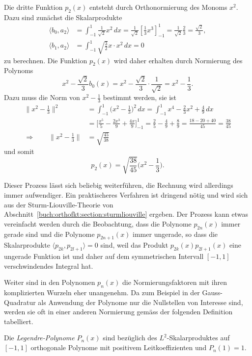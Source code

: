 Die dritte Funktion $p_2(x)$ entsteht durch Orthonormierung des
Monoms $x^2$.
Dazu sind zunächst die Skalarprodukte
\begin{align*}
\langle b_0,a_2\rangle
&=
\int_{-1}^1 \frac{1}{\!\sqrt{2}}x^2\,dx
=
\frac{1}{\!\sqrt{2}} [\frac13x^3]_{-1}^1
=
\frac{1}{\!\sqrt{2}} \frac{2}{3}
=
\frac{\!\sqrt{2}}{3},
\\
\langle b_1,a_2\rangle
&=
\int_{-1}^1 \!\sqrt{\frac{3}{2}} x \cdot x^2\,dx
= 
0
\end{align*}
zu berechnen.
Die Funktion $p_2(x)$ wird daher erhalten durch Normierung des Polynoms
\[
x^2 - 
\frac{\!\sqrt{2}}{3} b_0(x)
=
x^2-
\frac{\!\sqrt{2}}{3}\cdot\frac{1}{\!\sqrt{2}}
=
x^2-\frac13.
\]
Dazu muss die Norm von $x^2-\frac13$ bestimmt werden, sie ist
\begin{align*}
\|x^2-\frac13\|^2
&=
\int_{-1}^1 \biggl(x^2-{\textstyle\frac13}\biggr)^2\,dx
=
\int_{-1}^1 x^4-\frac23x^2+\frac{4}{9}\,dx
\\
&=
\biggl[\frac{x^5}{5} -\frac{2x^3}{9}+\frac{4x}{9}\biggr]_{-1}^1
=
\frac{2}{5} - \frac{4}{9} + \frac{8}{9}
=
\frac{18-20+40}{45}
=
\frac{38}{45}
\\
\Rightarrow\qquad
\|x^2-{\textstyle\frac13}\|
&=
\!\sqrt{\frac{45}{38}}
\end{align*}
und somit
\[
p_2(x)
= 
\!\sqrt{\frac{38}{45}} \biggl(x^2-\frac13\biggr).
\]

Dieser Prozess lässt sich beliebig weiterführen, die Rechnung wird
allerdings immer aufwendiger.
Ein praktischeres Verfahren ist dringend nötig und wird sich
aus der Sturm-Liouville-Theorie von
Abschnitt~\ref{buch:orthofkt:section:sturmliouville} ergeben.
Der Prozess kann etwas vereinfacht werden durch die Beobachtung, dass die
Polynome $p_{2n}(x)$ immer gerade sind und die Polynome $p_{2n+1}(x)$
immer ungerade, so dass die Skalarprodukte 
$\langle p_{2k},p_{2l+1}\rangle=0$ sind, weil das Produkt
$p_{2k}(x)p_{2l+1}(x)$ eine ungerade Funktion ist und daher auf
dem symmetrischen Intervall $[-1,1]$ verschwindendes Integral hat.

Weiter sind in den Polynomen $p_n(x)$ die Normierungsfaktoren mit
ihren komplizierten Wurzeln eher unangenehm.
Da zum Beispiel in der Gauss-Quadratur als Anwendung der Polynome
nur die Nullstellen von Interesse sind, werden sie oft in einer
anderen Normierung gemäss der folgenden Definition tabelliert.

\begin{definition}
Die {\em Legendre-Polynome} $P_n(x)$ sind bezüglich des $L^2$-Skalarproduktes 
auf $[-1,1]$ orthogonale Polynome mit positivem Leitkoeffizienten und
$P_n(1)=1$.
\end{definition}

